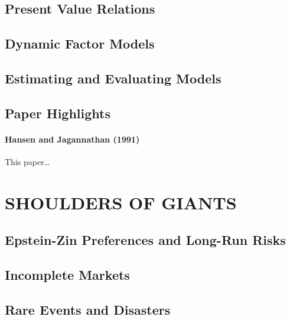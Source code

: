\documentclass[
]{book}
\begin{document}
\hypertarget{present-value-relations}{%
\chapter{Present Value Relations}\label{present-value-relations}}

\hypertarget{dynamic-factor-models}{%
\chapter{Dynamic Factor Models}\label{dynamic-factor-models}}

\hypertarget{estimating-and-evaluating-models}{%
\chapter{Estimating and Evaluating Models}\label{estimating-and-evaluating-models}}

\hypertarget{paper-highlights}{%
\chapter{Paper Highlights}\label{paper-highlights}}

\hypertarget{HansJaga:91}{%
\subsection{Hansen and Jagannathan (1991)}\label{HansJaga:91}}

This paper\ldots{}

\hypertarget{part-shoulders-of-giants}{%
\part*{SHOULDERS OF GIANTS}\label{part-shoulders-of-giants}}

\hypertarget{epstein-zin-preferences-and-long-run-risks}{%
\chapter{Epstein-Zin Preferences and Long-Run Risks}\label{epstein-zin-preferences-and-long-run-risks}}

\hypertarget{incomplete-markets}{%
\chapter{Incomplete Markets}\label{incomplete-markets}}

\hypertarget{rare-events-and-disasters}{%
\chapter{Rare Events and Disasters}\label{rare-events-and-disasters}}
\end{document}
